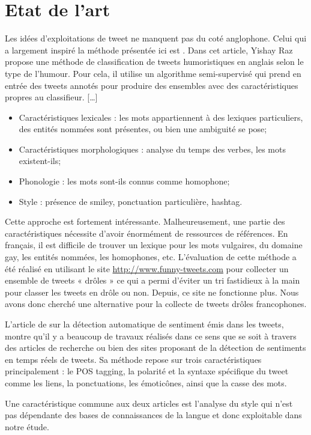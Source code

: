 \documentclass[10pt,a4paper,twoside]{article}
\begin{document}
\section{Etat de l'art}

Les idées d’exploitations de tweet ne manquent pas du coté anglophone. Celui qui a largement inspiré la méthode présentée ici est \cite{Raz12}.  Dans cet article, Yishay Raz propose une méthode de classification de tweets humoristiques en anglais selon le type de l’humour. Pour cela, il utilise un algorithme semi-supervisé qui prend en entrée des tweets annotés pour produire des ensembles avec des caractéristiques propres au classifieur.  […]

\begin{itemize}
\item Caractéristiques lexicales : les mots appartiennent à des lexiques particuliers, des entités nommées sont présentes, ou bien une ambiguité se pose;
\item Caractéristiques morphologiques : analyse du temps des verbes, les mots existent-ils;
\item Phonologie : les mots sont-ils connus comme homophone;
\item Style : présence de smiley, ponctuation particulière, hashtag.
\end{itemize}
Cette approche est fortement intéressante. Malheureusement, une partie des caractéristiques nécessite d’avoir énormément de ressources de références. En français, il est difficile de trouver un lexique pour les mots vulgaires, du domaine gay, les entités nommées, les homophones, etc. 
L’évaluation de cette méthode a été réalisé en utilisant le site \url{ http://www.funny-tweets.com} pour collecter un ensemble de tweets « drôles » ce qui a permi d’éviter un tri fastidieux à la main pour classer les tweets en drôle ou non. Depuis, ce site ne fonctionne plus. Nous avons donc cherché une alternative pour la collecte de tweets drôles francophones.

L’article de \cite{Barbosa2010} sur la détection automatique de sentiment émis dans les tweets, montre qu’il y a beaucoup de travaux réalisés dans ce sens que se soit à travers des articles de recherche ou bien des sites proposant de la détection de sentiments en temps réels de tweets.  Sa méthode repose sur trois caractéristiques principalement : le POS tagging, la polarité et la syntaxe spécifique du tweet comme les liens, la ponctuations, les émoticônes, ainsi que la casse des mots. 

Une caractéristique commune aux deux articles est l’analyse du style qui n’est pas dépendante des bases de connaissances de la langue et donc exploitable dans notre étude.
\end{document}

